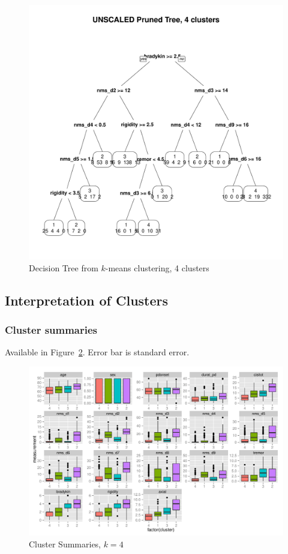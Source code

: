 \documentclass[letterpaper,12pt]{article}
\begin{document}
\begin{figure}[h]
  \centering
  \includegraphics[width=\linewidth]{dtree-kmeans-pruned-unscaled-4.pdf}
  \caption{Decision Tree from $k$-means clustering, 4 clusters}
  \label{fig:kmeans-dtree-4}
\end{figure}

\subsection{Interpretation of Clusters}

\subsubsection{Cluster summaries}

Available in Figure~\ref{fig:kmeans-summaries-4}. Error bar is standard error.

\begin{figure}[h]
  \centering
  \includegraphics[width=\linewidth]{kmeans-summaries-4.pdf}
  \caption{Cluster Summaries, $k = 4$}
  \label{fig:kmeans-summaries-4}
\end{figure}
\end{document}
